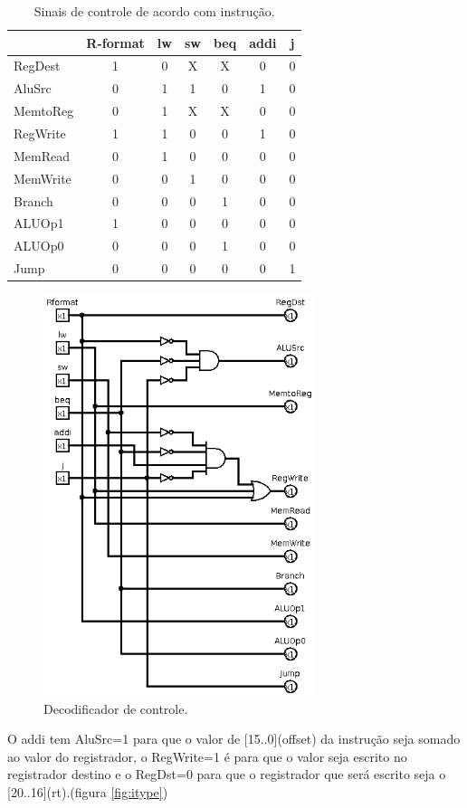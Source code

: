 \documentclass[12pt]{article}
\begin{document}
\begin{table}[htbp]
\centering
\begin{tabular}{l|c|c|c|c|c|c|}
 & R-format & lw & sw & beq & addi & j\\
\hline
RegDest & 1 & 0 & X & X & 0 & 0\\
AluSrc & 0 & 1 & 1 & 0 & 1 & 0\\
MemtoReg & 0 & 1 & X & X & 0 & 0\\
RegWrite & 1 & 1 & 0 & 0 & 1 & 0\\
MemRead & 0 & 1 & 0 & 0 & 0 & 0\\
MemWrite & 0 & 0 & 1 & 0 & 0 & 0\\
Branch & 0 & 0 & 0 & 1 & 0 & 0\\
ALUOp1 & 1 & 0 & 0 & 0 & 0 & 0\\
ALUOp0 & 0 & 0 & 0 & 1 & 0 & 0\\
Jump & 0 & 0 & 0 & 0 & 0 & 1\\
\end{tabular}
\caption{\label{tab:controldecode}
Sinais de controle de acordo com instrução.}

\end{table}

\begin{figure}[htbp]
\centering
\includegraphics[width=300px]{./controldecode.png}
\caption{\label{fig:controldecode}
Decodificador de controle.}
\end{figure}

O addi tem AluSrc=1 para que o valor de [15..0](offset) da instrução seja somado ao valor do registrador, o RegWrite=1 é para que o valor seja escrito no registrador destino e o RegDst=0 para que o registrador que será escrito seja o [20..16](rt).(figura \ref{fig:itype})
\end{document}
